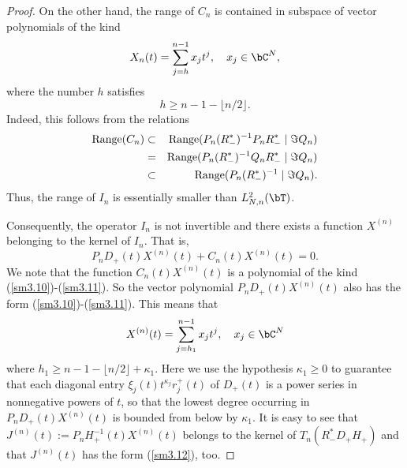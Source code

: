 \documentclass[addpoints,12pt,letter]{article}
\newcommand{\ka}{\kappa}
\renewcommand{\ge}{\geqslant}
\numberwithin{equation}{section}
\theoremstyle{definition}
\begin{document}
\begin{proof}
On the other hand, the range of $C_{n}$ is contained in subspace of vector polynomials of the kind
\begin{equation}\label{sm3.10}
X_{n}(t)=\sum_{j=h}^{n-1}x_{j}t^{j},\quad x_{j}\in \bC^N,
\end{equation}
where the number $h$ satisfies
\begin{equation}\label{sm3.11}
h\ge n-1-\lfloor n/2 \rfloor.
\end{equation}
Indeed, this follows from the relations
\begin{eqnarray*}
{\rm Range}(C_{n}) &\subset & {\rm Range}(P_{n}(R_{-}^{\ast})^{-1}P_{n}R_{-}^{\ast}\mid\Im Q_{n})\\
&=& {\rm Range}(P_{n}(R_{-}^{\ast})^{-1}Q_{n}R_{-}^{\ast}\mid\Im Q_{n})\\
& \subset & {\rm Range}(P_{n}(R_{-}^{\ast})^{-1}\mid\Im Q_{n}).
\end{eqnarray*}
Thus, the range of $I_{n}$ is essentially smaller than $L_{N,n}^{2}(\bT)$.

Consequently, the operator $I_{n}$ is not invertible and there exists a function $X^{(n)}$ belonging to the kernel of $I_{n}$.
That is,
\[
P_{n}D_{+}(t)X^{(n)}(t)+C_{n}(t)X^{(n)}(t)=0.
\]
We note that the function $C_{n}(t)X^{(n)}(t)$ is a polynomial of the kind (\ref{sm3.10})-(\ref{sm3.11}).
So the vector polynomial $P_{n}D_{+}(t)X^{(n)}(t)$ also has the form (\ref{sm3.10})-(\ref{sm3.11}).
This means that
\begin{equation}\label{sm3.12}
X^{(n)}(t)=\sum_{j=h_{1}}^{n-1}x_{j}t^{j},\quad x_{j}\in\bC^N
\end{equation}
where $h_{1}\ge n-1-\lfloor n/2 \rfloor+\ka_{1}$. Here we use the hypothesis $\ka_{1}\ge 0$ to guarantee that each diagonal entry $\xi_j(t)t^{\ka_{j}}r_j^+(t)$ of $D_{+}(t)$ is a power series in nonnegative powers of $t$, so that the lowest degree occurring in $P_{n}D_{+}(t)X^{(n)}(t)$ is bounded from below by $\ka_{1}$. It is easy to see that $J^{(n)}(t):=P_{n}H_{+}^{-1}(t)X^{(n)}(t)$ belongs to the kernel of $T_{n}(R_{-}^{\ast}D_{+}H_{+})$ and that $J^{(n)}(t)$ has the form (\ref{sm3.12}), too.


\end{proof}
\end{document}
